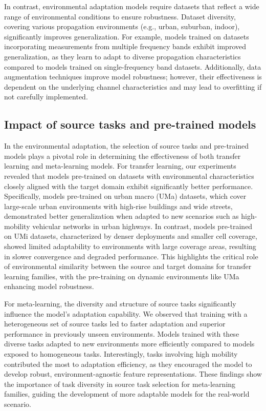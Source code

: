 \documentclass[lettersize,journal]{IEEEtran}
\begin{document}
In contrast, environmental adaptation models require datasets that reflect a wide range of environmental conditions to ensure robustness. Dataset diversity, covering various propagation environments (e.g., urban, suburban, indoor), significantly improves generalization. For example, models trained on datasets incorporating measurements from multiple frequency bands exhibit improved generalization, as they learn to adapt to diverse propagation characteristics compared to models trained on single-frequency band datasets. Additionally, data augmentation techniques improve model robustness; however, their effectiveness is dependent on the underlying channel characteristics and may lead to overfitting if not carefully implemented.

\subsection{Impact of source tasks and pre-trained models}
In the environmental adaptation, the selection of source tasks and pre-trained models plays a pivotal role in determining the effectiveness of both transfer learning and meta-learning models. For transfer learning, our experiments revealed that models pre-trained on datasets with environmental characteristics closely aligned with the target domain exhibit significantly better performance. Specifically, models pre-trained on urban macro (UMa) datasets, which cover large-scale urban environments with high-rise buildings and wide streets, demonstrated better generalization when adapted to new scenarios such as high-mobility vehicular networks in urban highways. In contrast, models pre-trained on UMi datasets, characterized by denser deployments and smaller cell coverage, showed limited adaptability to environments with large coverage areas, resulting in slower convergence and degraded performance. This highlights the critical role of environmental similarity between the source and target domains for transfer learning families, with the pre-training on dynamic environments like UMa enhancing model robustness.

For meta-learning, the diversity and structure of source tasks significantly influence the model’s adaptation capability. We observed that training with a heterogeneous set of source tasks led to faster adaptation and superior performance in previously unseen environments. Models trained with these diverse tasks adapted to new environments more efficiently compared to models exposed to homogeneous tasks. Interestingly, tasks involving high mobility contributed the most to adaptation efficiency, as they encouraged the model to develop robust, environment-agnostic feature representations. These findings show the importance of task diversity in source task selection for meta-learning families, guiding the development of more adaptable models for the real-world scenario.
\end{document}

